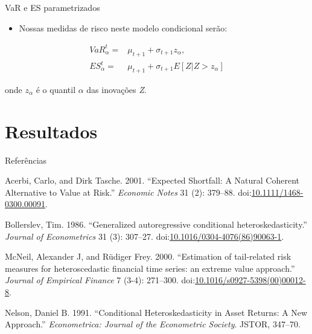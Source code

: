\documentclass[ignorenonframetext,]{beamer}
\providecommand{\tightlist}{%
\setlength{\itemsep}{0pt}\setlength{\parskip}{0pt}}
\begin{document}
\begin{frame}{VaR e ES parametrizados}

\begin{itemize}
\tightlist
\item
  Nossas medidas de risco neste modelo condicional serão:
\end{itemize}

\begin{align*}
VaR_\alpha^t=&\mu_{t+1}+\sigma_{t+1}z_\alpha, \\
ES_\alpha^t=&\mu_{t+1}+\sigma_{t+1}E[Z | Z>z_\alpha]
\end{align*}

onde \(z_\alpha\) é o quantil \(\alpha\) das inovações \emph{Z}.

\end{frame}

\section{Resultados}\label{resultados}

\begin{frame}{Referências}

\hypertarget{refs}{}
\hypertarget{ref-Acerbi2001}{}
Acerbi, Carlo, and Dirk Tasche. 2001. ``Expected Shortfall: A Natural
Coherent Alternative to Value at Risk.'' \emph{Economic Notes} 31 (2):
379--88.
doi:\href{https://doi.org/10.1111/1468-0300.00091}{10.1111/1468-0300.00091}.

\hypertarget{ref-Bollerslev1986}{}
Bollerslev, Tim. 1986. ``Generalized autoregressive conditional
heteroskedasticity.'' \emph{Journal of Econometrics} 31 (3): 307--27.
doi:\href{https://doi.org/10.1016/0304-4076(86)90063-1}{10.1016/0304-4076(86)90063-1}.

\hypertarget{ref-McNeil2000}{}
McNeil, Alexander J, and Rüdiger Frey. 2000. ``Estimation of
tail-related risk measures for heteroscedastic financial time series: an
extreme value approach.'' \emph{Journal of Empirical Finance} 7 (3-4):
271--300.
doi:\href{https://doi.org/10.1016/s0927-5398(00)00012-8}{10.1016/s0927-5398(00)00012-8}.

\hypertarget{ref-Nelson1991}{}
Nelson, Daniel B. 1991. ``Conditional Heteroskedasticity in Asset
Returns: A New Approach.'' \emph{Econometrica: Journal of the
Econometric Society}. JSTOR, 347--70.

\end{frame}
\end{document}
